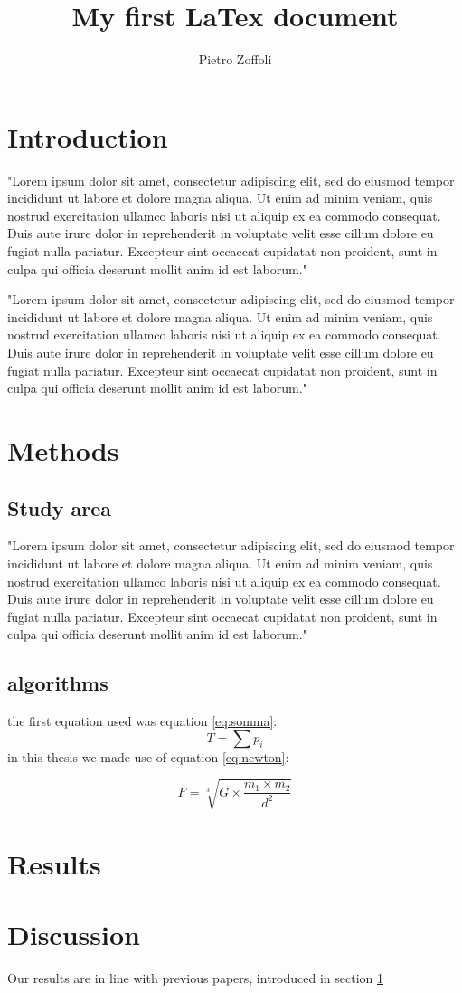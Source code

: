 \documentclass[12pt]{article}
\title{My first LaTex document}
\author{Pietro Zoffoli}
\begin{document}
\maketitle 
\tableofcontents 

\section{Introduction}\label{sec:intro}
"Lorem ipsum dolor sit amet, consectetur adipiscing elit, sed do eiusmod tempor incididunt ut labore et dolore magna aliqua. Ut enim ad minim veniam, quis nostrud exercitation ullamco laboris nisi ut aliquip ex ea commodo consequat. Duis aute irure dolor in reprehenderit in voluptate velit esse cillum dolore eu fugiat nulla pariatur. Excepteur sint occaecat cupidatat non proident, sunt in culpa qui officia deserunt mollit anim id est laborum."

\noindent "Lorem ipsum dolor sit amet, consectetur adipiscing elit, sed do eiusmod tempor incididunt ut labore et dolore magna aliqua. Ut enim ad minim veniam, quis nostrud exercitation ullamco laboris nisi ut aliquip ex ea commodo consequat. Duis aute irure dolor in reprehenderit in voluptate velit esse cillum dolore eu fugiat nulla pariatur. Excepteur sint occaecat cupidatat non proident, sunt in culpa qui officia deserunt mollit anim id est laborum."

\section{Methods}
\subsection{Study area}
"Lorem ipsum dolor sit amet, consectetur adipiscing elit, sed do eiusmod tempor incididunt ut labore et dolore magna aliqua. Ut enim ad minim veniam, quis nostrud exercitation ullamco laboris nisi ut aliquip ex ea commodo consequat. Duis aute irure dolor in reprehenderit in voluptate velit esse cillum dolore eu fugiat nulla pariatur. Excepteur sint occaecat cupidatat non proident, sunt in culpa qui officia deserunt mollit anim id est laborum."
\subsection{algorithms}
the first equation used was equation \ref{eq:somma}:
\begin{equation}
    T=\sum p_i
    \label{eq:somma}
\end{equation}
\noindent in this thesis we made use of equation \ref{eq:newton}:

\begin{equation}
    F = \sqrt[3]{G \times \frac{m_1 \times m_2}{d^2}}
    \label{eq:newton}
\end{equation}


\section{Results}
\section{Discussion}
Our results are in line with previous papers, introduced in section \ref{sec:intro}
\end{document}
